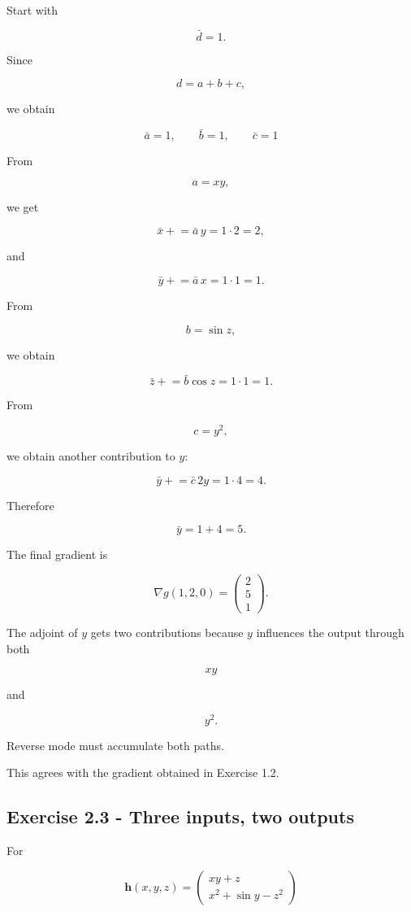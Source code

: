 \documentclass[10pt]{article}
\begin{document}
Start with

\[
\bar d=1.
\]

Since

\[
d=a+b+c,
\]

we obtain

\[
\bar a=1,
\qquad
\bar b=1,
\qquad
\bar c=1
\]

From

\[
a=xy,
\]

we get

\[
\bar x
\mathrel{+}=
\bar a\,y
=1\cdot2
=2,
\]

and

\[
\bar y
\mathrel{+}=
\bar a\,x
=1\cdot1
=1.
\]

From

\[
b=\sin z,
\]

we obtain

\[
\bar z
\mathrel{+}=
\bar b\cos z
=1\cdot1
=1.
\]

From

\[
c=y^2,
\]

we obtain another contribution to $y$:

\[
\bar y
\mathrel{+}=
\bar c\,2y
=1\cdot4
=4.
\]

Therefore

\[
\bar y=1+4=5.
\]

The final gradient is

\[
{
\nabla g(1,2,0)
=
\begin{pmatrix}
2\\5\\1
\end{pmatrix}
}.
\]

The adjoint of $y$ gets two contributions because $y$ influences the output through both

\[
xy
\]

and

\[
y^2.
\]

Reverse mode must accumulate both paths.

This agrees with the gradient obtained in Exercise 1.2.
\par\endgroup

\subsection*{Exercise 2.3 - Three inputs, two outputs}
For

\[
\mathbf h(x,y,z) = \begin{pmatrix} xy+z\\ x^2+\sin y-z^2\end{pmatrix}
\]
\end{document}
